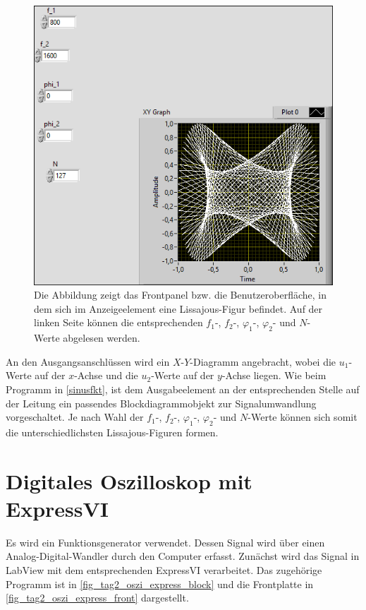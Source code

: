 \documentclass[
a4paper,
12pt,
pagesize,
ngerman
]{scrartcl}
\begin{document}
	\begin{figure}[H]
		\centering
		\includegraphics[width=1.0\textwidth]{EIRE2018Dateien/Tag1/lissajous-bilder/Lissajousp}
		\caption{Die Abbildung zeigt das Frontpanel bzw. die Benutzeroberfläche, in dem sich im Anzeigeelement eine Lissajous-Figur befindet. Auf der linken Seite können die entsprechenden $f_1$-, $f_2$-, $\varphi_1$-, $\varphi_2$- und $N$-Werte abgelesen werden.}
		\label{lissajous}
	\end{figure}

	\noindent An den Ausgangsanschlüssen wird ein $X$-$Y$-Diagramm angebracht, wobei die $u_1$-Werte auf der $x$-Achse und die $u_2$-Werte auf der $y$-Achse liegen. Wie beim Programm in \cref{sinusfkt}, ist dem Ausgabeelement an der entsprechenden Stelle auf der Leitung ein passendes Blockdiagrammobjekt zur Signalumwandlung vorgeschaltet. Je nach Wahl der $f_1$-, $f_2$-, $\varphi_1$-, $\varphi_2$- und $N$-Werte können sich somit die unterschiedlichsten Lissajous-Figuren formen.
	
	
	\section{Digitales Oszilloskop mit ExpressVI}
	Es wird ein Funktionsgenerator verwendet.
	Dessen Signal wird über einen Analog-Digital-Wandler durch den Computer erfasst.
	Zunächst wird das Signal in LabView mit dem entsprechenden ExpressVI verarbeitet.
	Das zugehörige Programm ist in \cref{fig_tag2_oszi_express_block} und die Frontplatte in \cref{fig_tag2_oszi_express_front} dargestellt.
	
\end{document}
